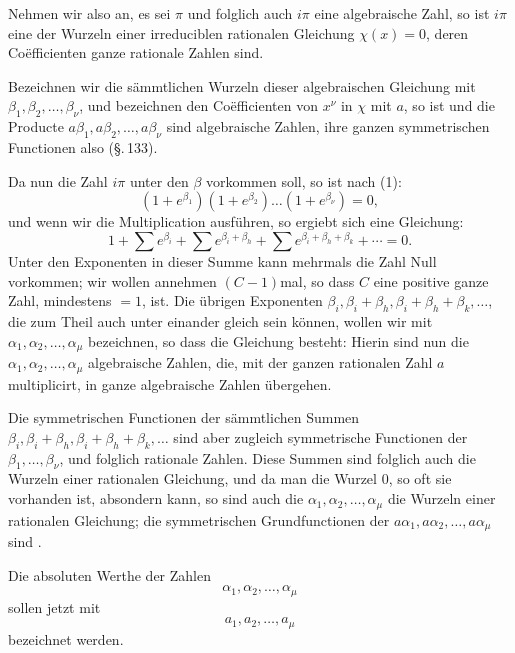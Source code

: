 
Nehmen wir also an, es sei $\pi$ und folglich auch $i\pi$ eine algebraische Zahl, so ist $i\pi$ eine der Wurzeln einer irreduciblen rationalen Gleichung $\chi(x)=0$, deren Coëfficienten ganze rationale Zahlen sind.

Bezeichnen wir die sämmtlichen Wurzeln dieser algebraischen Gleichung mit $\beta_1,\beta_2,\ldots,\beta_\nu$, und bezeichnen den Coëfficienten von $x^\nu$ in $\chi$ mit $a$, so ist
und die Producte $a\beta_1,a\beta_2,\ldots,a\beta_\nu$ sind  algebraische Zahlen, ihre ganzen symmetrischen Functionen also  (\S.\,133).

Da nun die Zahl $i\pi$ unter den $\beta$ vorkommen soll, so ist nach (1):
\[
(1+e^{\beta_1})(1+e^{\beta_2})\ldots(1+e^{\beta_\nu}) = 0,
\]
und wenn wir die Multiplication ausführen, so ergiebt sich eine Gleichung:
\[
1 + \sum e^{\beta_i} + \sum e^{\beta_i+\beta_h} + \sum e^{\beta_i+\beta_h+\beta_k} + \cdots = 0.
\]
Unter den Exponenten in dieser Summe kann mehrmals die Zahl Null vorkommen; wir wollen annehmen $(C-1)$mal, so dass $C$ eine positive ganze Zahl, mindestens $=1$, ist. Die übrigen Exponenten $\beta_i,\beta_i+\beta_h,\beta_i+\beta_h+\beta_k,\ldots$, die zum Theil auch unter einander gleich sein können, wollen wir mit $\alpha_1,\alpha_2,\ldots,\alpha_\mu$ bezeichnen, so dass die Gleichung besteht:
Hierin sind nun die $\alpha_1,\alpha_2,\ldots,\alpha_\mu$ algebraische Zahlen, die, mit der ganzen rationalen Zahl $a$ multiplicirt, in ganze algebraische Zahlen übergehen.

Die symmetrischen Functionen der sämmtlichen Summen $\beta_i,\beta_i+\beta_h,\beta_i+\beta_h+\beta_k,\ldots$ sind aber zugleich symmetrische Functionen der $\beta_1,\ldots,\beta_\nu$, und folglich rationale Zahlen. Diese Summen sind folglich auch die Wurzeln einer rationalen Gleichung, und da man die Wurzel $0$, so oft sie vorhanden ist, absondern kann, so sind auch die $\alpha_1,\alpha_2,\ldots,\alpha_\mu$ die Wurzeln einer rationalen Gleichung; die symmetrischen Grundfunctionen der $a\alpha_1,a\alpha_2,\ldots,a\alpha_\mu$ sind .

Die absoluten Werthe der Zahlen
\[
\alpha_1,\alpha_2,\ldots,\alpha_\mu
\]
sollen jetzt mit
\[
a_1,a_2,\ldots,a_\mu
\]
bezeichnet werden.
